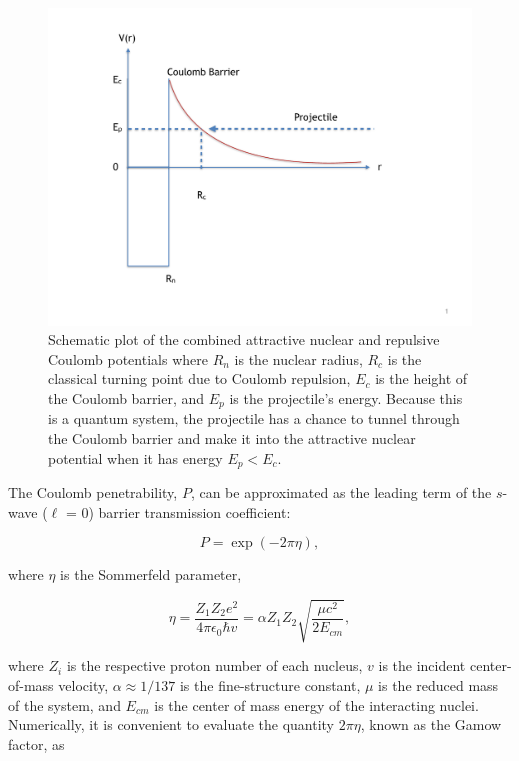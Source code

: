 \begin{figure}
\includegraphics[width=\linewidth]{figures/potentials.pdf}
\caption{Schematic plot of the combined attractive nuclear and repulsive Coulomb potentials where $R_{n}$ is the nuclear radius, $R_{c}$ is the classical turning point due to Coulomb repulsion, $E_{c}$ is the height of the Coulomb barrier, and $E_{p}$ is the projectile's energy. Because this is a quantum system, the projectile has a chance to tunnel through the Coulomb barrier and make it into the attractive nuclear potential when it has energy $E_{p} < E_{c}$. }
\label{fig: potentials}
\end{figure}

The Coulomb penetrability, $P$, can be approximated as the leading term of the $s$-wave ($\ell$ = 0) barrier transmission coefficient:

\begin{equation}
P = \exp(-2\pi\eta),
\end{equation}

\noindent where $\eta$ is the Sommerfeld parameter,

\begin{equation}
\eta = \dfrac{Z_{1}Z_{2}e^{2}}{4 \pi \epsilon_{0} \hbar v} = \alpha Z_{1} Z_{2} \sqrt{\dfrac{\mu c^{2}}{2E_{cm}}},
\end{equation}

\noindent where $Z_{i}$ is the respective proton number of each nucleus, $v$ is the incident center-of-mass velocity, $\alpha \approx 1/137$ is the fine-structure constant, $\mu$ is the reduced mass of the system, and $E_{cm}$ is the center of mass energy of the interacting nuclei. Numerically, it is convenient to evaluate the quantity $2\pi \eta$, known as the Gamow factor, as

